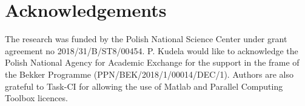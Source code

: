 \documentclass[runningheads]{llncs}
\begin{document}
\section*{Acknowledgements}
The research was funded by the Polish National Science Center under grant agreement no 2018/31/B/ST8/00454. 
P. Kudela would like to acknowledge the Polish National Agency for Academic Exchange for the support in the frame of the Bekker Programme (PPN/BEK/2018/1/00014/DEC/1). 
Authors are also grateful to Task-CI for allowing the use of Matlab and Parallel Computing Toolbox licences. 
%
%
%
 
 
%
\end{document}
